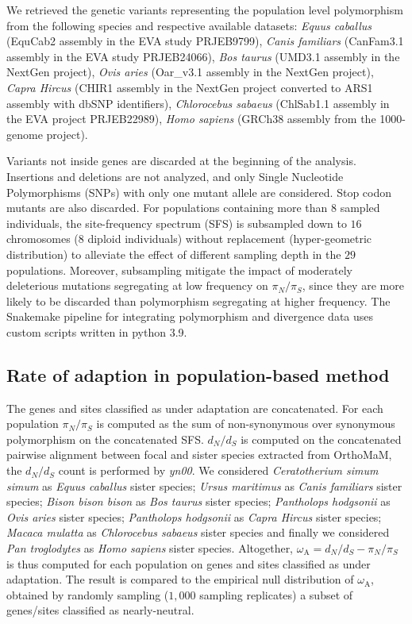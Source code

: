 \documentclass{article}
\newcommand{\dn}{d_N}
\newcommand{\ds}{d_S}
\newcommand{\dnds}{\dn / \ds}
\newcommand{\rateApop}{\omega_{\mathrm{A}}}
\newcommand{\pn}{\pi_N}
\newcommand{\ps}{\pi_S}
\newcommand{\pnps}{\pn / \ps}
\begin{document}
    We retrieved the genetic variants representing the population level polymorphism from the following species and respective available datasets: \textit{Equus caballus} (EquCab2 assembly in the EVA study PRJEB9799\cite{alabri_whole_2020}), \textit{Canis familiars} (CanFam3.1 assembly in the EVA study PRJEB24066\cite{jagannathan_comprehensive_2019}),  \textit{Bos taurus} (UMD3.1 assembly in the NextGen project), \textit{Ovis aries} (Oar\_v3.1 assembly in the NextGen project), \textit{Capra Hircus} (CHIR1 assembly in the NextGen project converted to ARS1 assembly with dbSNP identifiers\cite{sherry_dbsnp_2001}), \textit{Chlorocebus sabaeus} (ChlSab1.1 assembly in the EVA project PRJEB22989\cite{svardal_ancient_2017}), \textit{Homo sapiens} (GRCh38 assembly from the 1000-genome project\cite{consortium_integrated_2012, the1000genomesprojectconsortium_global_2015}).

    Variants not inside genes are discarded at the beginning of the analysis.
    Insertions and deletions are not analyzed, and only Single Nucleotide Polymorphisms (SNPs) with only one mutant allele are considered.
    Stop codon mutants are also discarded.
    For populations containing more than $8$ sampled individuals, the site-frequency spectrum (SFS) is subsampled down to $16$ chromosomes ($8$ diploid individuals) without replacement (hyper-geometric distribution) to alleviate the effect of different sampling depth in the $29$ populations.
    Moreover, subsampling mitigate the impact of moderately deleterious mutations segregating at low frequency on $\pnps$, since they are more likely to be discarded than polymorphism segregating at higher frequency.
    The Snakemake pipeline for integrating polymorphism and divergence data uses custom scripts written in python 3.9.

    \subsection*{Rate of adaption in population-based method}

    The genes and sites classified as under adaptation are concatenated.
    For each population $\pnps$ is computed as the sum of non-synonymous over synonymous polymorphism on the concatenated SFS\@.
    $\dnds$ is computed on the concatenated pairwise alignment between focal and sister species extracted from OrthoMaM, the $\dnds$ count is performed by \textit{yn00}.
    We considered \textit{Ceratotherium simum simum} as \textit{Equus caballus} sister species; \textit{Ursus maritimus} as \textit{Canis familiars} sister species; \textit{Bison bison bison} as \textit{Bos taurus} sister species; \textit{Pantholops hodgsonii} as \textit{Ovis aries} sister species; \textit{Pantholops hodgsonii} as \textit{Capra Hircus} sister species; \textit{Macaca mulatta} as \textit{Chlorocebus sabaeus} sister species and finally we considered \textit{Pan troglodytes} as \textit{Homo sapiens} sister species.
    Altogether, $\rateApop = \dnds - \pnps$ is thus computed for each population on genes and sites classified as under adaptation.
    The result is compared to the empirical null distribution of $\rateApop$, obtained by randomly sampling ($1,000$ sampling replicates) a subset of genes/sites classified as nearly-neutral.
\end{document}

